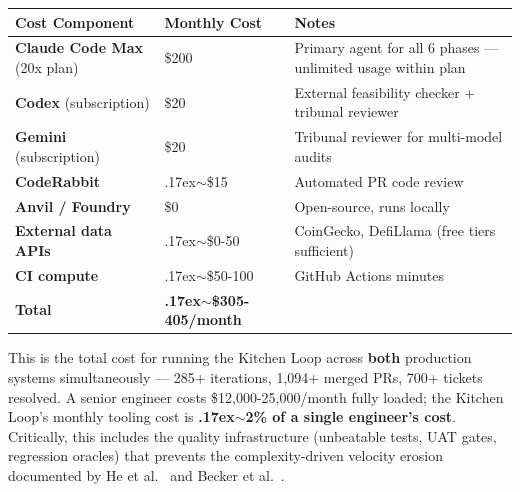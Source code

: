 \documentclass[11pt,a4paper]{article}
\newcounter{none} %
\newcommand{\roughly}{{\textraisebox{.17ex}{$\scriptstyle\sim$}}}
\newcommand{\textraisebox}[2]{\leavevmode\raise#1\hbox{#2}}
\begin{document}
{\def\LTcaptype{none} %
\begin{longtable}[]{@{}
  >{\raggedright\arraybackslash}p{}
  >{\raggedright\arraybackslash}p{}
  >{\raggedright\arraybackslash}p{}@{}}
\toprule\noalign{}
\begin{minipage}[b]{\linewidth}\raggedright
Cost Component
\end{minipage} & \begin{minipage}[b]{\linewidth}\raggedright
Monthly Cost
\end{minipage} & \begin{minipage}[b]{\linewidth}\raggedright
Notes
\end{minipage} \\
\midrule\noalign{}
\endhead
\bottomrule\noalign{}
\endlastfoot
\textbf{Claude Code Max} (20x plan) & \$200 & Primary agent for all 6 phases --- unlimited usage within plan \\
\textbf{Codex} (subscription) & \$20 & External feasibility checker + tribunal reviewer \\
\textbf{Gemini} (subscription) & \$20 & Tribunal reviewer for multi-model audits \\
\textbf{CodeRabbit} & \roughly\$15 & Automated PR code review \\
\textbf{Anvil / Foundry} & \$0 & Open-source, runs locally \\
\textbf{External data APIs} & \roughly\$0-50 & CoinGecko, DefiLlama (free tiers sufficient) \\
\textbf{CI compute} & \roughly\$50-100 & GitHub Actions minutes \\
\textbf{Total} & \textbf{\roughly\$305-405/month} & \\
\end{longtable}
}

This is the total cost for running the Kitchen Loop across \textbf{both} production systems simultaneously --- 285+ iterations, 1,094+ merged PRs, 700+ tickets resolved. A senior engineer costs \$12,000-25,000/month fully loaded; the Kitchen Loop's monthly tooling cost is \textbf{\roughly2\% of a single engineer's cost}. Critically, this includes the quality infrastructure (unbeatable tests, UAT gates, regression oracles) that prevents the complexity-driven velocity erosion documented by He et al.~\cite{he2025} and Becker et al.~\cite{becker2025}.
\end{document}
